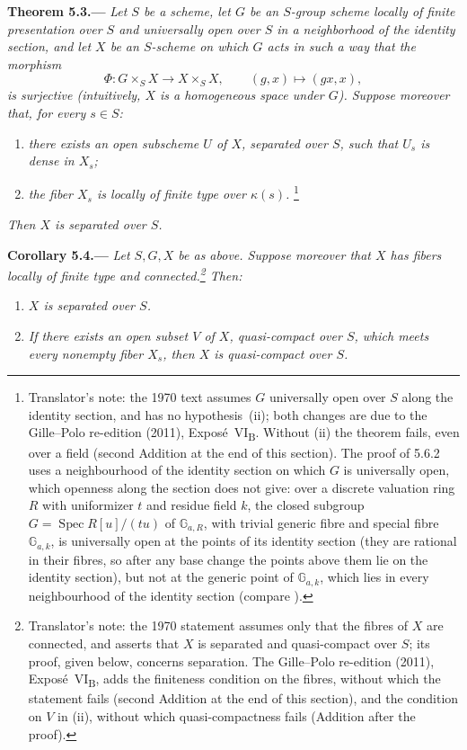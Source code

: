 \medskip
{}\label{thm:sga3-VIB-5.3}%
\noindent\textbf{Theorem 5.3.---}
\emph{Let \(S\) be a scheme, let \(G\) be an \(S\)-group scheme
locally of finite presentation over \(S\) and universally open over
\(S\) in a neighborhood of the identity section, and let \(X\) be
an \(S\)-scheme on which \(G\) acts in such a way that the morphism}
\[
  \Phi:G\times_S X\longrightarrow X\times_S X,
  \qquad (g,x)\longmapsto(gx,x),
\]
\emph{is surjective \textup{(}intuitively, \(X\) is a homogeneous space under \(G\)\textup{)}. Suppose
moreover that, for every \(s\in S\):}
\begin{enumerate}
\item[\textup{(i)}] \emph{there exists an open subscheme \(U\) of
  \(X\), separated over \(S\), such that \(U_s\) is dense in
  \(X_s\);}
\item[\textup{\SGAInlineRefTarget{thm:sga3-VIB-5.3:item:ii}(ii)}] \emph{the fiber \(X_s\) is locally of finite
  type over \(\kappa(s)\).}%
\footnote{Translator's note: the 1970 text assumes \(G\) universally open over \(S\) along the identity
section, and has no hypothesis~(ii); both changes are due to the Gille--Polo re-edition (2011),
Expos\'e~VI\textsubscript{B}. Without (ii) the theorem fails, even over a field (second Addition at the end
of this section). The proof of 5.6.2 uses a neighbourhood of the identity section on which \(G\) is universally
open, which openness along the section does not give: over a discrete valuation ring \(R\) with uniformizer
\(t\) and residue field \(k\), the closed subgroup \(G=\operatorname{Spec}R[u]/(tu)\) of \(\mathbb G_{a,R}\),
with trivial generic fibre and special fibre \(\mathbb G_{a,k}\), is universally open at the points of its
identity section (they are rational in their fibres, so after any base change the points above them lie on the
identity section), but not at the generic point of \(\mathbb G_{a,k}\), which lies in every neighbourhood of
the identity section (compare ).}
\end{enumerate}
\emph{Then \(X\) is separated over \(S\).}

\medskip
{}\label{cor:sga3-VIB-5.4}%
\noindent\textbf{Corollary 5.4.---}
\emph{Let \(S,G,X\) be as above.
Suppose moreover that \(X\) has fibers locally of finite type and
connected.\footnote{Translator's note: the 1970 statement assumes only that the fibres of \(X\) are connected,
and asserts that \(X\) is separated and quasi-compact over \(S\); its proof, given below, concerns separation.
The Gille--Polo re-edition (2011), Expos\'e~VI\textsubscript{B}, adds the finiteness condition on the fibres,
without which the statement fails (second Addition at the end of this section), and the condition on \(V\) in
(ii), without which quasi-compactness fails (Addition after the proof).} Then:}
\begin{enumerate}
\item[\textup{\SGAInlineRefTarget{cor:sga3-VIB-5.4:item:i}(i)}] \emph{\(X\) is separated over \(S\).}
\item[\textup{(ii)}] \emph{If there exists an open subset \(V\) of
  \(X\), quasi-compact over \(S\), which meets every nonempty fiber
  \(X_s\), then \(X\) is quasi-compact over \(S\).}
\end{enumerate}

